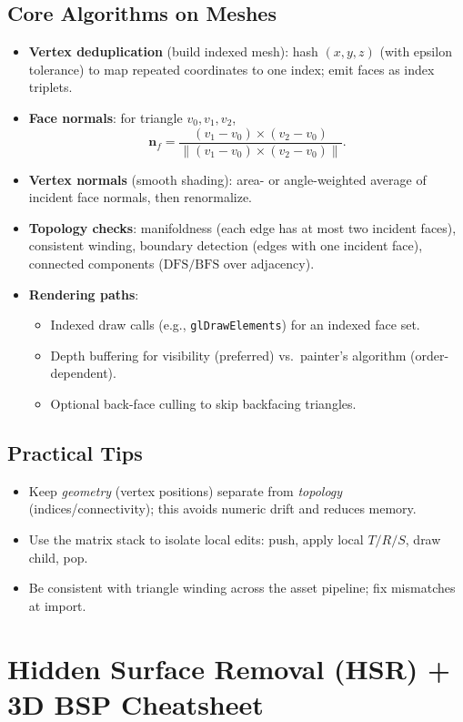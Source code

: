 \documentclass[8pt,twocolumn]{extarticle}
\begin{document}
\subsection*{Core Algorithms on Meshes}
\begin{itemize}
  \item \textbf{Vertex deduplication} (build indexed mesh): hash \((x,y,z)\) (with epsilon tolerance) to map repeated coordinates to one index; emit faces as index triplets.
  \item \textbf{Face normals}: for triangle \(v_0,v_1,v_2\),
  \[
    \mathbf n_f = \frac{(v_1 - v_0) \times (v_2 - v_0)}{\|(v_1 - v_0) \times (v_2 - v_0)\|}.
  \]
  \item \textbf{Vertex normals} (smooth shading): area- or angle-weighted average of incident face normals, then renormalize.
  \item \textbf{Topology checks}: manifoldness (each edge has at most two incident faces), consistent winding, boundary detection (edges with one incident face), connected components (\( \mathrm{DFS}/\mathrm{BFS} \) over adjacency).
  \item \textbf{Rendering paths}:
    \begin{itemize}
      \item Indexed draw calls (e.g., \verb|glDrawElements|) for an indexed face set.
      \item Depth buffering for visibility (preferred) vs.\ painter’s algorithm (order-dependent).
      \item Optional back-face culling to skip backfacing triangles.
    \end{itemize}
\end{itemize}

\subsection*{Practical Tips}
\begin{itemize}
  \item Keep \emph{geometry} (vertex positions) separate from \emph{topology} (indices/connectivity); this avoids numeric drift and reduces memory.
  \item Use the matrix stack to isolate local edits: push, apply local \(T/R/S\), draw child, pop.
  \item Be consistent with triangle winding across the asset pipeline; fix mismatches at import.
\end{itemize}


\section*{Hidden Surface Removal (HSR) + 3D BSP Cheatsheet}
\end{document}
